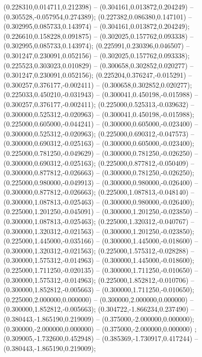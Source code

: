  (0.228310,0.014711,0.212398) -- (0.304161,0.013872,0.204249) -- (0.305528,-0.057954,0.274389);
 (0.227382,0.086380,0.147101) -- (0.302995,0.085733,0.143974) -- (0.304161,0.013872,0.204249);
 (0.226610,0.158228,0.091875) -- (0.302025,0.157762,0.093338) -- (0.302995,0.085733,0.143974);
 (0.225991,0.230396,0.046507) -- (0.301247,0.230091,0.052156) -- (0.302025,0.157762,0.093338);
 (0.225523,0.303023,0.010829) -- (0.300658,0.302852,0.020277) -- (0.301247,0.230091,0.052156);
 (0.225204,0.376247,-0.015291) -- (0.300257,0.376177,-0.002411) -- (0.300658,0.302852,0.020277);
 (0.225033,0.450210,-0.031943) -- (0.300041,0.450198,-0.015988) -- (0.300257,0.376177,-0.002411);
 (0.225000,0.525313,-0.039632) -- (0.300000,0.525312,-0.020963) -- (0.300041,0.450198,-0.015988);
 (0.225000,0.605000,-0.044241) -- (0.300000,0.605000,-0.023400) -- (0.300000,0.525312,-0.020963);
 (0.225000,0.690312,-0.047573) -- (0.300000,0.690312,-0.025163) -- (0.300000,0.605000,-0.023400);
 (0.225000,0.781250,-0.049629) -- (0.300000,0.781250,-0.026250) -- (0.300000,0.690312,-0.025163);
 (0.225000,0.877812,-0.050409) -- (0.300000,0.877812,-0.026663) -- (0.300000,0.781250,-0.026250);
 (0.225000,0.980000,-0.049913) -- (0.300000,0.980000,-0.026400) -- (0.300000,0.877812,-0.026663);
 (0.225000,1.087813,-0.048140) -- (0.300000,1.087813,-0.025463) -- (0.300000,0.980000,-0.026400);
 (0.225000,1.201250,-0.045091) -- (0.300000,1.201250,-0.023850) -- (0.300000,1.087813,-0.025463);
 (0.225000,1.320312,-0.040767) -- (0.300000,1.320312,-0.021563) -- (0.300000,1.201250,-0.023850);
 (0.225000,1.445000,-0.035166) -- (0.300000,1.445000,-0.018600) -- (0.300000,1.320312,-0.021563);
 (0.225000,1.575312,-0.028288) -- (0.300000,1.575312,-0.014963) -- (0.300000,1.445000,-0.018600);
 (0.225000,1.711250,-0.020135) -- (0.300000,1.711250,-0.010650) -- (0.300000,1.575312,-0.014963);
 (0.225000,1.852812,-0.010706) -- (0.300000,1.852812,-0.005663) -- (0.300000,1.711250,-0.010650);
 (0.225000,2.000000,0.000000) -- (0.300000,2.000000,0.000000) -- (0.300000,1.852812,-0.005663);
 (0.304722,-1.866234,0.237490) -- (0.380443,-1.865190,0.219009) -- (0.375000,-2.000000,0.000000);
 (0.300000,-2.000000,0.000000) -- (0.375000,-2.000000,0.000000) ;
 (0.309005,-1.732600,0.452948) -- (0.385369,-1.730917,0.417244) -- (0.380443,-1.865190,0.219009);
